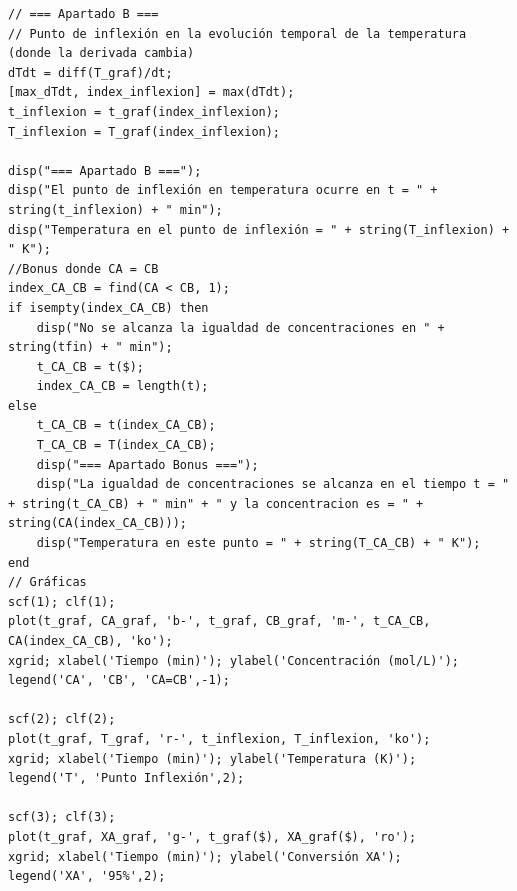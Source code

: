 \begin{verbatim}
// === Apartado B ===
// Punto de inflexión en la evolución temporal de la temperatura (donde la derivada cambia)
dTdt = diff(T_graf)/dt;
[max_dTdt, index_inflexion] = max(dTdt);
t_inflexion = t_graf(index_inflexion);
T_inflexion = T_graf(index_inflexion);

disp("=== Apartado B ===");
disp("El punto de inflexión en temperatura ocurre en t = " + string(t_inflexion) + " min");
disp("Temperatura en el punto de inflexión = " + string(T_inflexion) + " K");
//Bonus donde CA = CB
index_CA_CB = find(CA < CB, 1);
if isempty(index_CA_CB) then
    disp("No se alcanza la igualdad de concentraciones en " + string(tfin) + " min");
    t_CA_CB = t($);
    index_CA_CB = length(t);
else
    t_CA_CB = t(index_CA_CB);
    T_CA_CB = T(index_CA_CB);
    disp("=== Apartado Bonus ===");
    disp("La igualdad de concentraciones se alcanza en el tiempo t = " + string(t_CA_CB) + " min" + " y la concentracion es = " + string(CA(index_CA_CB)));
    disp("Temperatura en este punto = " + string(T_CA_CB) + " K");
end
// Gráficas
scf(1); clf(1);
plot(t_graf, CA_graf, 'b-', t_graf, CB_graf, 'm-', t_CA_CB, CA(index_CA_CB), 'ko');
xgrid; xlabel('Tiempo (min)'); ylabel('Concentración (mol/L)');
legend('CA', 'CB', 'CA=CB',-1);

scf(2); clf(2);
plot(t_graf, T_graf, 'r-', t_inflexion, T_inflexion, 'ko');
xgrid; xlabel('Tiempo (min)'); ylabel('Temperatura (K)');
legend('T', 'Punto Inflexión',2);

scf(3); clf(3);
plot(t_graf, XA_graf, 'g-', t_graf($), XA_graf($), 'ro');
xgrid; xlabel('Tiempo (min)'); ylabel('Conversión XA');
legend('XA', '95%',2);
\end{verbatim}
